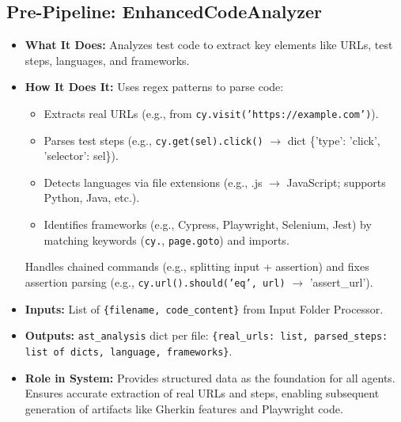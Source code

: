 \documentclass{article}
\begin{document}
\subsection{Pre-Pipeline: EnhancedCodeAnalyzer}
\begin{itemize}
    \item \textbf{What It Does:} Analyzes test code to extract key elements like URLs, test steps, languages, and frameworks.
    \item \textbf{How It Does It:} Uses regex patterns to parse code:
        \begin{itemize}
            \item Extracts real URLs (e.g., from \texttt{cy.visit('https://example.com')}).
            \item Parses test steps (e.g., \texttt{cy.get(sel).click()} $\rightarrow$ dict \{'type': 'click', 'selector': sel\}).
            \item Detects languages via file extensions (e.g., .js $\rightarrow$ JavaScript; supports Python, Java, etc.).
            \item Identifies frameworks (e.g., Cypress, Playwright, Selenium, Jest) by matching keywords (\texttt{cy.}, \texttt{page.goto}) and imports.
        \end{itemize}
        Handles chained commands (e.g., splitting input + assertion) and fixes assertion parsing (e.g., \texttt{cy.url().should('eq', url)} $\rightarrow$ 'assert\_url').
    \item \textbf{Inputs:} List of \texttt{\{filename, code\_content\}} from Input Folder Processor.
    \item \textbf{Outputs:} \texttt{ast\_analysis} dict per file: \texttt{\{real\_urls: list, parsed\_steps: list of dicts, language, frameworks\}}.
    \item \textbf{Role in System:} Provides structured data as the foundation for all agents. Ensures accurate extraction of real URLs and steps, enabling subsequent generation of artifacts like Gherkin features and Playwright code.
\end{itemize}
\end{document}
